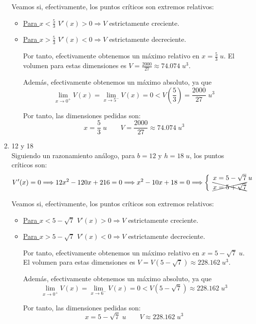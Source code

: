 \begin{ejercicio}
\begin{enumerate}
        Veamos si, efectivamente, los puntos críticos son extremos relativos:
        \begin{itemize}
            \item \underline{Para $x<\frac{5}{3}$} $V'(x)>0 \Longrightarrow V$ estrictamente creciente.
            \item \underline{Para $x>\frac{5}{3}$} $V'(x)<0 \Longrightarrow V$ estrictamente decreciente.

        Por tanto, efectivamente obtenemos un máximo relativo en $x=\frac{5}{3}\;u.$ El volumen para estas dimensiones es $V=\frac{2000}{27}\approx 74.074\;u^3$.

        Además, efectivamente obtenemos un máximo absoluto, ya que
        $$\lim_{x\to 0^+}V(x) = \lim_{x\to 5^-}V(x) = 0 < V\left(\frac{5}{3}\right) = \frac{2000}{27}\;u^3$$

        Por tanto, las dimensiones pedidas son:
        $$x=\frac{5}{3}\;u \qquad V=\frac{2000}{27}\approx 74.074\;u^3$$
        \end{itemize}
        
        \item 12 y 18\\
        Siguiendo un razonamiento análogo, para $b=12$ y $h=18\;u$, los puntos críticos son:
        \begin{equation*}
            V'(x)=0\Longrightarrow 12x^2 - 120x + 216 = 0 \Longrightarrow x^2 - 10x + 18=0\Longrightarrow  \left\{\begin{array}{l}
                x = 5-\sqrt{7}\;u \\
                \xcancel{x=5+\sqrt{7}}
            \end{array}\right.
        \end{equation*}

        Veamos si, efectivamente, los puntos críticos son extremos relativos:
        \begin{itemize}
            \item \underline{Para $x<5-\sqrt{7}$} $V'(x)>0 \Longrightarrow V$ estrictamente creciente.
            \item \underline{Para $x>5-\sqrt{7}$} $V'(x)<0 \Longrightarrow V$ estrictamente decreciente.

        Por tanto, efectivamente obtenemos un máximo relativo en $x=5-\sqrt{7}\;u.$ El volumen para estas dimensiones es $V=V(5-\sqrt{7})\approx 228.162\;u^3$.

        Además, efectivamente obtenemos un máximo absoluto, ya que
        $$\lim_{x\to 0^+}V(x) = \lim_{x\to 6^-}V(x) = 0 < V\left(5-\sqrt{7}\right) \approx 228.162\;u^3$$

        Por tanto, las dimensiones pedidas son:
        $$x=5-\sqrt{7}\;u \qquad V\approx 228.162\;u^3$$
        \end{itemize}
    \end{enumerate}
\end{ejercicio}

